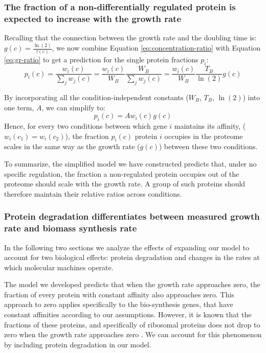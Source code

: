 \documentclass{article}
\begin{document}
\subsubsection{The fraction of a non-differentially regulated protein is expected to increase with the growth rate} 
Recalling that the connection between the growth rate and the doubling time is: $g(c)=\frac{\ln(2)}{\tau(c)}$, we now combine Equation \ref{eq:concentration-ratio} with Equation \ref{eq:gr-ratio} to get a prediction for the single protein fractions $p_i$:
\begin{equation}
  \label{eq:default-response}
  p_i(c)=\frac{w_i(c)}{\sum_jw_j(c)}=\frac{w_i(c)}{W_B}\frac{W_B}{\sum_jw_j(c)}=\frac{w_i(c)}{W_B}\frac{T_B}{\ln(2)}g(c)
\end{equation}

By incorporating all the condition-independent constants ($W_B$, $T_B$, $\ln(2)$) into one term, $A$, we can simplify to:
\begin{equation}
  \label{eq:final-conc}
  p_i(c)=Aw_i(c)g(c)
\end{equation}
Hence, for every two conditions between which gene $i$ maintains its affinity, ($w_i(c_1)=w_i(c_2)$), the fraction $p_i(c)$ protein $i$ occupies in the proteome scales in the same way as the growth rate ($g(c)$) between these two conditions.

To summarize, the simplified model we have constructed predicts that, under no specific regulation, the fraction a non-regulated protein occupies out of the proteome should scale with the growth rate.
A group of such proteins should therefore maintain their relative ratios across conditions.

\subsubsection{Protein degradation differentiates between measured growth rate and biomass synthesis rate}
\label{degradation}
In the following two sections we analyze the effects of expanding our model to account for two biological effects: protein degradation and changes in the rates at which molecular machines operate.

The model we developed predicts that when the growth rate approaches zero, the fraction of every protein with constant affinity also approaches zero.
This approach to zero applies specifically to the bio-synthesis genes, that have constant affinities according to our assumptions.
However, it is known that the fractions of these proteins, and specifically of ribosomal proteins does not drop to zero when the growth rate approaches zero \cite{ingraham1983growth,Pedersen1978a}.
We can account for this phenomenon by including protein degradation in our model.
\end{document}
